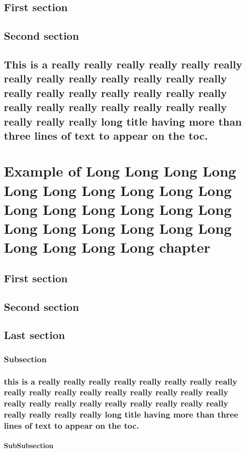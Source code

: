 \documentclass{mines-thesis}
\begin{document}
\section{First section} \lipsum[2-3]
\section{Second section} \lipsum[4-5]
\section{This is a really really really really really really really really really really really really really really really really really really really really really really really really really really really really really really long title having more than three lines of text to appear on the toc.}
\lipsum[1-2]

\lipsum[1-2]

\chapter{Example of Long  Long Long Long Long Long Long Long Long Long Long Long Long Long Long Long Long Long Long Long Long Long Long Long Long Long chapter}
\lipsum[1-10]

\section{First section} \lipsum[2-3]
\section{Second section} \lipsum[4-5]
\section{Last section} \lipsum[6-7]
\subsection{Subsection}
\lipsum[4-5]
\subsection{this is a really really really really really really really really really really really really really really really really really really really really really really really really really really really really really really long title having more than three lines of text to appear on the toc.}
\subsubsection{SubSubsection}
\lipsum[1]
\end{document}
